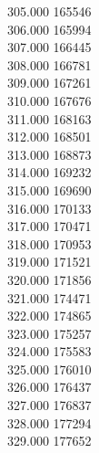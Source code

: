 { 305.000	165546 \\
 306.000	165994 \\
 307.000	166445 \\
 308.000	166781 \\
 309.000	167261 \\
 310.000	167676 \\
 311.000	168163 \\
 312.000	168501 \\
 313.000	168873 \\
 314.000	169232 \\
 315.000	169690 \\
 316.000	170133 \\
 317.000	170471 \\
 318.000	170953 \\
 319.000	171521 \\
 320.000	171856 \\
 321.000	174471 \\
 322.000	174865 \\
 323.000	175257 \\
 324.000	175583 \\
 325.000	176010 \\
 326.000	176437 \\
 327.000	176837 \\
 328.000	177294 \\
 329.000	177652 \\
}

